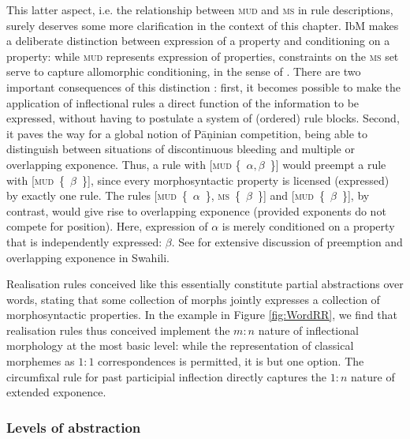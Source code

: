 \documentclass[output=paper]{langsci/langscibook}
\begin{document}
This latter aspect, i.e. the relationship between \textsc{mud} and
\textsc{ms} in rule descriptions, surely deserves some more
clarification in the context of this chapter. IbM makes a deliberate
distinction between expression of a property and conditioning on a
property: while \textsc{mud} represents expression of properties,
constraints on the \textsc{ms} set serve to capture allomorphic
conditioning, in the sense of \citet{Carstairs87}. There are two
important consequences of this distinction \citep{Crysmann:14:OUP}:
first, it becomes possible to make the application of inflectional
rules a direct function of the information to be expressed, without
having to postulate a system of (ordered) rule blocks. Second, it
paves the way for a global notion of Pāṇinian competition, being able
to distinguish between situations of discontinuous bleeding
\citep{Noyer92} and multiple or overlapping exponence. Thus, a rule
with [\textsc{mud} \{~$\alpha,\beta$~\}] would preempt a rule with
[\textsc{mud}~\{~$\beta$~\}], since every morphosyntactic property is
licensed (expressed) by exactly one rule. The rules
[\textsc{mud}~\{~$\alpha$~\}, \textsc{ms}~\{~$\beta$~\}] and
[\textsc{mud}~\{~$\beta$~\}], by contrast, would give rise to
overlapping exponence (provided exponents do not compete for
position). Here, expression of $\alpha$ is merely conditioned on a
property that is independently expressed: $\beta$. See
\citet{Crysmann:14:OUP} for extensive discussion of preemption and
overlapping exponence in Swahili.

Realisation rules conceived like this essentially constitute partial
abstractions over words, stating that some collection of morphs
jointly expresses a collection of morphosyntactic properties. In the
example in Figure \ref{fig:WordRR}, we find that realisation rules
thus conceived implement the $m:n$ nature of inflectional morphology
at the most basic level: while the representation of
classical morphemes as $1:1$ correspondences is permitted, it is but one
option. The circumfixal rule for past participial inflection directly
captures the $1:n$ nature of extended exponence.


 
\subsubsection{Levels of abstraction}
\end{document}
